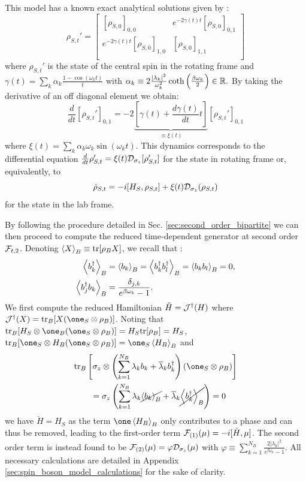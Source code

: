 \documentclass[10pt,aps,pra,twocolumn,showpacs,superscriptaddress,nobalancelastpage,notitlepage,nofootinbib,longbibliography]{revtex4-2}
\begin{document}
This model has a known exact analytical solutions given by \cite[eq. (336) and (374)]{lidar2020lecturenotestheoryopen}:
\[\rho_{S,t}' = \begin{bmatrix}
[\rho_{S,0}]_{0,0}&e^{-2\gamma(t)t}[\rho_{S,0}]_{0,1}\\
e^{-2{\gamma(t)}t}[\rho_{S,0}]_{1,0}&[\rho_{S,0}]_{1,1}\\
\end{bmatrix}\]
where $\rho_{S,t}'$ is the state of the central spin in the rotating frame and  
\(\gamma(t) = \sum_k \alpha_k \frac{1-\cos(\omega_k t)}{t}\)
with $\alpha_k \equiv 2\frac{|\lambda_k|^2}{\omega_k^2}\coth\left(\frac{\beta\omega_k}{2}\right)\in\mathbb{R}.$
By taking the derivative of an off diagonal element we obtain:
\[\frac{d}{dt}[{\rho}_{S,t}']_{0,1} = -2\underbrace{\left[\gamma(t) + \frac{d\gamma(t)}{dt}t\right]}_{\equiv \xi(t)}[{\rho}_{S,t}']_{0,1}\]
where \(\xi(t) = \sum_k\alpha_k\omega_k\sin(\omega_k t)\).
This dynamics corresponds to the differential equation 
\( \frac{d}{dt}\rho_{S,t}' = \xi(t)\mathcal{D}_{\sigma_z}[\rho_{S,t}']\)
for the state in rotating frame or, equivalently, to
\begin{equation}
    \dot{\rho}_{S,t} = -i[H_S,\rho_{S,t}] + \xi(t) \mathcal{D}_{\sigma_z}(\rho_{S,t})
    \label{eq:exact_boson}
\end{equation} 
for the state in the lab frame. 

By following the procedure detailed in Sec. \ref{sec:second_order_bipartite} we can then proceed to compute the reduced time-dependent generator at second order $\mathcal{F}_{t,2}$. 
Denoting $\left< X \right>_B \equiv {\rm tr}[\rho_B X]$, we recall that \cite[eq. (331)]{lidar2020lecturenotestheoryopen}: 
\begin{align*}
    \left< b_k^\dag \right>_B &= \left< b_k \right>_B = \left< b_k^\dag b_l^\dag \right>_B = \left< b_k b_l \right>_B = 0,\\
    \left< b_j^\dag b_k \right>_B &= \frac{\delta_{j,k}}{e^{\beta\omega_k}-1}.
\end{align*}
We first compute the reduced Hamiltonian $\check{H} = \mathcal{J}^\dag(H)$ where $\Jc^\dag(X) = \tr_B[X(\one_S\otimes\rho_B)]$. Noting that $\tr_B[H_S\otimes\one_B(\one_S\otimes\rho_B)] = H_S \tr[\rho_B] = H_S$, $\tr_B[\one_S\otimes H_B(\one_S\otimes\rho_B)] = \one_S \expect{H_B}_B$ and
\begin{align*}
    &\tr_B\left[\sigma_z\otimes\left(\sum_{k=1}^{N_B}\lambda_k b_k + \overline{\lambda}_k b_k^\dag\right)(\one_S\otimes\rho_B)\right]\\ &\qquad = \sigma_z \left( \sum_{k=1}^{N_B}\lambda_k \cancel{\expect{b_k}_B} + \overline{\lambda}_k \cancel{\expect{b_k^\dag}_B} \right) = 0
\end{align*}
we have \(\check{H} = H_S \) as the term \(\one \expect{H_B}_B\) only contributes to a phase and can thus be removed, leading to the first-order term $\mathcal{F}_{(1)}(\mu) = -i[\check{H},\mu]$. The second order term is instead found to be $\mathcal{F}_{(2)}(\mu) = \varphi \mathcal{D}_{\sigma_z}(\mu)$ with $\varphi\equiv \sum_{k=1}^{N_B} \frac{2|\lambda_k|^2}{e^{\beta \omega_k}-1}$. All necessary calculations are detailed in Appendix \ref{sec:spin_boson_model_calculations} for the sake of clarity. 
\end{document}
